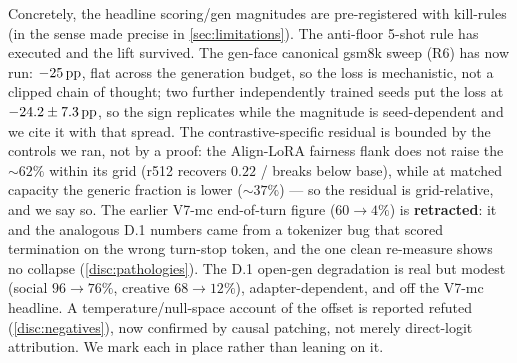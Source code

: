 Concretely, the headline scoring/gen magnitudes are pre-registered with kill-rules
(in the sense made precise in \cref{sec:limitations}).
The anti-floor 5-shot rule has executed and the lift survived. The gen-face
canonical gsm8k sweep (R6) has now run: $-25\,\mathrm{pp}$, flat across the generation budget,
so the loss is mechanistic, not a clipped chain of thought; two further independently
trained seeds put the loss at $-24.2 \pm 7.3\,\mathrm{pp}$, so the sign replicates while the
magnitude is seed-dependent and we cite it with that spread. The
contrastive-specific residual is bounded by the controls we ran, not by a proof: the
Align-LoRA fairness flank does not raise the ${\sim}62\%$ within its grid (r512
recovers $0.22$ / breaks below base), while at matched capacity the generic fraction
is lower (${\sim}37\%$) --- so the residual is grid-relative, and we say so.
The earlier V7-mc end-of-turn figure ($60{\rightarrow}4\%$) is \textbf{retracted}:
it and the analogous D.1 numbers came from a tokenizer bug that scored termination
on the wrong turn-stop token, and the one clean re-measure shows no collapse
(\cref{disc:pathologies}). The D.1 open-gen degradation is real but modest (social
$96{\rightarrow}76\%$, creative $68{\rightarrow}12\%$), adapter-dependent, and off
the V7-mc headline. A temperature/null-space account of the offset is reported
refuted (\cref{disc:negatives}), now confirmed by causal patching, not merely
direct-logit attribution. We mark each in place rather than leaning on it.

